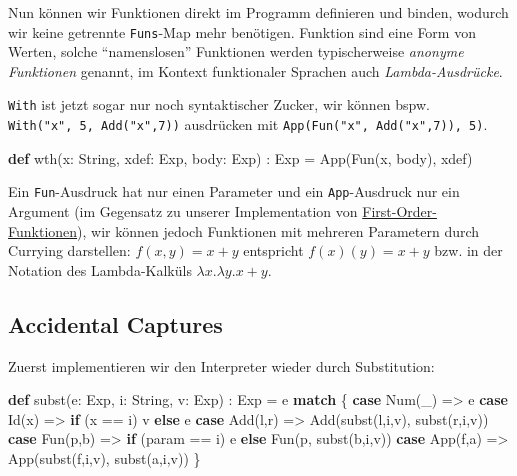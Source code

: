 \documentclass[]{article}
\newenvironment{Shaded}{}{}
\newcommand{\FunctionTok}[1]{\textcolor[rgb]{0.02,0.16,0.49}{#1}}
\newcommand{\KeywordTok}[1]{\textcolor[rgb]{0.00,0.44,0.13}{\textbf{#1}}}
\newcommand{\NormalTok}[1]{#1}
\begin{document}
Nun können wir Funktionen direkt im Programm definieren und binden,
wodurch wir keine getrennte \texttt{Funs}-Map mehr benötigen. Funktion
sind eine Form von Werten, solche ``namenslosen'' Funktionen werden
typischerweise \emph{anonyme Funktionen} genannt, im Kontext
funktionaler Sprachen auch \emph{Lambda-Ausdrücke}.

\texttt{With} ist jetzt sogar nur noch syntaktischer Zucker, wir können
bspw. \texttt{With("x",\ 5,\ Add("x",7))} ausdrücken mit
\texttt{App(Fun("x",\ Add("x",7)),\ 5)}.

\begin{Shaded}
\begin{Highlighting}[]
\KeywordTok{def} \FunctionTok{wth}\NormalTok{(x: String, xdef: Exp, body: Exp) : Exp = }\FunctionTok{App}\NormalTok{(}\FunctionTok{Fun}\NormalTok{(x, body), xdef)}
\end{Highlighting}
\end{Shaded}

Ein \texttt{Fun}-Ausdruck hat nur einen Parameter und ein
\texttt{App}-Ausdruck nur ein Argument (im Gegensatz zu unserer
Implementation von
\protect\hyperlink{first-order-funktionen-f1-wae}{First-Order-Funktionen}),
wir können jedoch Funktionen mit mehreren Parametern durch Currying
darstellen: \(f(x,y)= x+y\) entspricht \(f(x)(y) = x+y\) bzw. in der
Notation des Lambda-Kalküls \(\lambda x.\lambda y.x+y\).

\hypertarget{accidental-captures}{%
\subsection{Accidental Captures}\label{accidental-captures}}

Zuerst implementieren wir den Interpreter wieder durch Substitution:

\begin{Shaded}
\begin{Highlighting}[]
\KeywordTok{def} \FunctionTok{subst}\NormalTok{(e: Exp, i: String, v: Exp) : Exp = e }\KeywordTok{match}\NormalTok{ \{}
  \KeywordTok{case} \FunctionTok{Num}\NormalTok{(\_) =\textgreater{} e}
  \KeywordTok{case} \FunctionTok{Id}\NormalTok{(x) =\textgreater{} }\KeywordTok{if}\NormalTok{ (x == i) v }\KeywordTok{else}\NormalTok{ e}
  \KeywordTok{case} \FunctionTok{Add}\NormalTok{(l,r) =\textgreater{} }\FunctionTok{Add}\NormalTok{(}\FunctionTok{subst}\NormalTok{(l,i,v), }\FunctionTok{subst}\NormalTok{(r,i,v))}
  \KeywordTok{case} \FunctionTok{Fun}\NormalTok{(p,b) =\textgreater{}}
    \KeywordTok{if}\NormalTok{ (param == i) e }\KeywordTok{else} \FunctionTok{Fun}\NormalTok{(p, }\FunctionTok{subst}\NormalTok{(b,i,v))}
  \KeywordTok{case} \FunctionTok{App}\NormalTok{(f,a) =\textgreater{} }\FunctionTok{App}\NormalTok{(}\FunctionTok{subst}\NormalTok{(f,i,v), }\FunctionTok{subst}\NormalTok{(a,i,v))}
\NormalTok{\}}
\end{Highlighting}
\end{Shaded}
\end{document}
